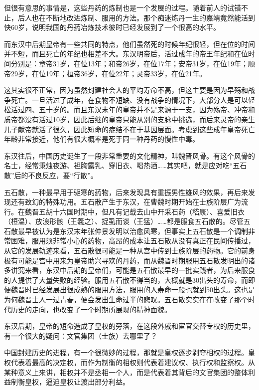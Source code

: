 \documentclass[]{book}
\begin{document}
但很有意思的事情是，这些丹药的炼制也是一个发展的过程。随着前人的试错不止，后人也在不断地改进炼制、服用的方法。那个痴迷炼丹一生的嘉靖竟然能活到快60岁，说明我国的丹药冶炼技术彼时已经发展到了一个很高的水平。

而东汉中后期皇帝有一些共同的特点，他们虽然死的时候年纪很轻，但在位的时间并不短，而且死亡的年纪也相差不大。东汉明帝后，活过成年的帝王年纪和在位时间分别是：章帝31岁，在位13年；和帝26岁，在位17年；安帝31岁，在位19年；顺帝29岁，在位19年；桓帝36岁，在位22年；灵帝33岁，在位21年。

这其实很不正常，因为虽然封建社会人的平均寿命不高，但这主要是因为早殇和战争死亡。一旦活过了成年，在食物不短缺、没有战争的情况下，大部分人是可以轻松活过四、五十岁的。而且东汉末年的皇帝并不是来源于一支，因为殇帝、冲帝和质帝都没有活过10岁，因此后继的皇帝只能从别的支脉中挑选，而后来灵帝的亲生儿子献帝就活了很久，因此短命的症结不在于基因层面。考虑到这些成年皇帝死亡年龄非常接近，他们有很大概率是死于同一种丹药的慢性中毒。

东汉往后，中国历史诞生了一段非常重要的文化精神，叫魏晋风骨。有这个风骨的名士，经常秉烛夜游、袒胸露乳、穿旧衣、喝热酒\ldots{}\ldots{}其实吧，就是应对吃``五石散''后的不良反应，要``行散''。

五石散，一种最早用于驱寒的药物，后来发现具有重振男性雄风的效果，再后来发现还有致幻的特殊功用。五石散产生于东汉，在曹魏时期开始在士族阶层广为流行。在魏晋五胡十六国时期中，但凡有记载去山中开采石药（嵇康）、喜爱旧衣（桓温）、放浪形骸（王羲之）、捉虱而谈（王猛）\ldots{}\ldots{}都是服食五石散的。尽管五石散最早被认为是东汉末年张仲景发明以治愈风寒，但事实上五石散是一个调制非常困难，服用须非常小心的药物，高昂的成本让五石散从没有真正在民间传播过，从它的发展轨迹来看，五石散很可能是一种从宫中传到士族阶层的药物。它的前身极有可能是宫中用来为皇帝助兴寻欢的丹药，而从魏晋时期服用五石散发明出的诸多讲究来看，东汉中后期的皇帝们，可能是五石散最早的一批实践者，为后来服食的人提供了大量失败的经验。服用五石散不得当的，大概就是30出头的寿命，而即便魏晋时已经发展出很成熟的服用方法，服用的人寿命一般也就到50出头。这也是为何魏晋士人一过青春，便会发出生命过半的悲叹。五石散实实在在改变了那个时代历史的走向，也改变了一个时期所展现的精神面貌。

东汉后期，皇帝的短命造成了皇权的旁落，在这段外戚和宦官交替专权的历史里，有一个很大的疑问：文官集团（士族）去哪里了？

中国封建历史的进程，有一个很微妙的过程，那就是皇权逐步剥夺相权的过程。皇权代表着最高的决定权，而作为制衡的相权则代表着建议权、执行权和监察权。从某种意义上来讲，相权并不是丞相一个人，而是代表着其背后的文官集团的整体利益制衡皇权，逼迫皇权让渡出部分利益。
\end{document}
